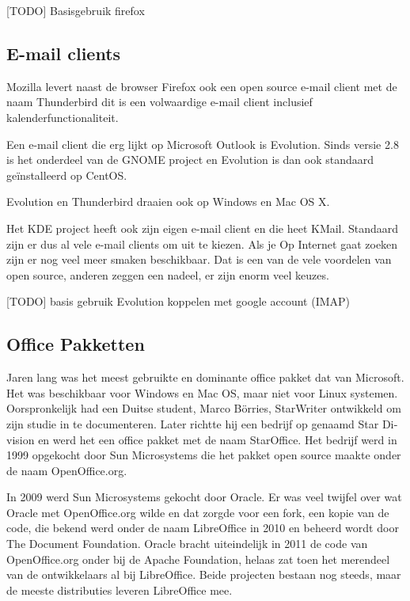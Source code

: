 {
\foreignlanguage{dutch}{[TODO] Basisgebruik firefox}}

\subsection[E{}-mail clients]{E-mail clients}
\hypertarget{RefHeadingToc24521698778599}{}{
Mozilla levert naast de browser Firefox ook een open source e-mail client met de naam
Thunderbird dit is een volwaardige e-mail client inclusief kalenderfunctionaliteit.}

{
Een e-mail client die erg lijkt op Microsoft Outlook is Evolution. Sinds versie 2.8 is het onderdeel
van de GNOME project en Evolution is dan ook standaard ge\"installeerd op CentOS.}

{
Evolution en Thunderbird draaien ook op Windows en Mac OS X.}

{
Het KDE project heeft ook zijn eigen e-mail client en die heet KMail. Standaard zijn er dus al vele e-mail
clients om uit te kiezen. Als je Op Internet gaat zoeken zijn er nog veel meer smaken beschikbaar. Dat is een van de
vele voordelen van open source, anderen zeggen een nadeel, er zijn enorm veel keuzes.}

{
[TODO] basis gebruik Evolution koppelen met google account (IMAP)}

\subsection[Office Pakketten]{ Office Pakketten}
\hypertarget{RefHeadingToc24781698778599}{}{
\foreignlanguage{dutch}{Jaren lang was het meest gebruikte en dominante office pakket dat van Microsoft. Het was
beschikbaar voor Windows en Mac OS, maar niet voor Linux systemen. Oorspronkelijk had een Duitse student, Marco
B\"orries, StarWriter ontwikkeld om zijn studie in te documenteren. Later richtte hij een bedrijf op genaamd Star
Division en werd het een office pakket met de naam StarOffice. Het bedrijf werd in 1999 opgekocht door Sun Microsystems
die het pakket open source maakte onder de naam OpenOffice.org.}}

{
\foreignlanguage{dutch}{In 2009 werd Sun Microsystems gekocht door Oracle. Er was veel twijfel over wat Oracle met
OpenOffice.org wilde en dat zorgde voor een fork, een kopie van de code, die bekend werd onder de naam LibreOffice in
2010 en beheerd wordt door The Document Foundation. Oracle bracht }\foreignlanguage{dutch}{uiteindelijk in 2011 de code
van OpenOffice.org onder bij de Apache Foundation, helaas zat toen het merendeel van de ontwikkelaars al bij
LibreOffice. Beide projecten bestaan nog steeds, maar de meeste distributies leveren LibreOffice mee.}}

